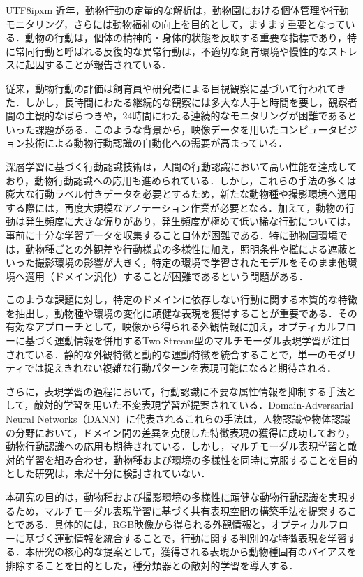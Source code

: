 \documentclass[twocolumn]{svjour3}
\begin{document}
\begin{CJK}{UTF8}{ipxm}
近年，動物行動の定量的な解析は，動物園における個体管理や行動モニタリング，さらには動物福祉の向上を目的として，ますます重要となっている\cite{mellor2017updating}．動物の行動は，個体の精神的・身体的状態を反映する重要な指標であり\cite{broom1986indicators}，特に常同行動と呼ばれる反復的な異常行動は，不適切な飼育環境や慢性的なストレスに起因することが報告されている\cite{mason1991stereotypies}．

従来，動物行動の評価は飼育員や研究者による目視観察に基づいて行われてきた．しかし，長時間にわたる継続的な観察には多大な人手と時間を要し，観察者間の主観的なばらつきや，24時間にわたる連続的なモニタリングが困難であるといった課題がある．このような背景から，映像データを用いたコンピュータビジョン技術による動物行動認識の自動化への需要が高まっている．

深層学習に基づく行動認識技術は，人間の行動認識において高い性能を達成しており\cite{carreira2017quo}，動物行動認識への応用も進められている．しかし，これらの手法の多くは膨大な行動ラベル付きデータを必要とするため，新たな動物種や撮影環境へ適用する際には，再度大規模なアノテーション作業が必要となる．加えて，動物の行動は発生頻度に大きな偏りがあり，発生頻度が極めて低い稀な行動については，事前に十分な学習データを収集すること自体が困難である．特に動物園環境では，動物種ごとの外観差や行動様式の多様性に加え，照明条件や檻による遮蔽といった撮影環境の影響が大きく，特定の環境で学習されたモデルをそのまま他環境へ適用（ドメイン汎化）することが困難であるという問題がある．

このような課題に対し，特定のドメインに依存しない行動に関する本質的な特徴を抽出し，動物種や環境の変化に頑健な表現を獲得することが重要である．その有効なアプローチとして，映像から得られる外観情報に加え，オプティカルフローに基づく運動情報を併用するTwo-Stream型のマルチモーダル表現学習が注目されている\cite{simonyan2014two}．静的な外観特徴と動的な運動特徴を統合することで，単一のモダリティでは捉えきれない複雑な行動パターンを表現可能になると期待される．

さらに，表現学習の過程において，行動認識に不要な属性情報を抑制する手法として，敵対的学習を用いた不変表現学習が提案されている．Domain-Adversarial Neural Networks（DANN）\cite{ganin2016domain}に代表されるこれらの手法は，人物認識や物体認識の分野において，ドメイン間の差異を克服した特徴表現の獲得に成功しており，動物行動認識への応用も期待されている．しかし，マルチモーダル表現学習と敵対的学習を組み合わせ，動物種および環境の多様性を同時に克服することを目的とした研究は，未だ十分に検討されていない．

本研究の目的は，動物種および撮影環境の多様性に頑健な動物行動認識を実現するため，マルチモーダル表現学習に基づく共有表現空間の構築手法を提案することである．具体的には，RGB映像から得られる外観情報と，オプティカルフローに基づく運動情報を統合することで，行動に関する判別的な特徴表現を学習する．本研究の核心的な提案として，獲得される表現から動物種固有のバイアスを排除することを目的とした，種分類器との敵対的学習を導入する．


\end{CJK}
\end{document}
